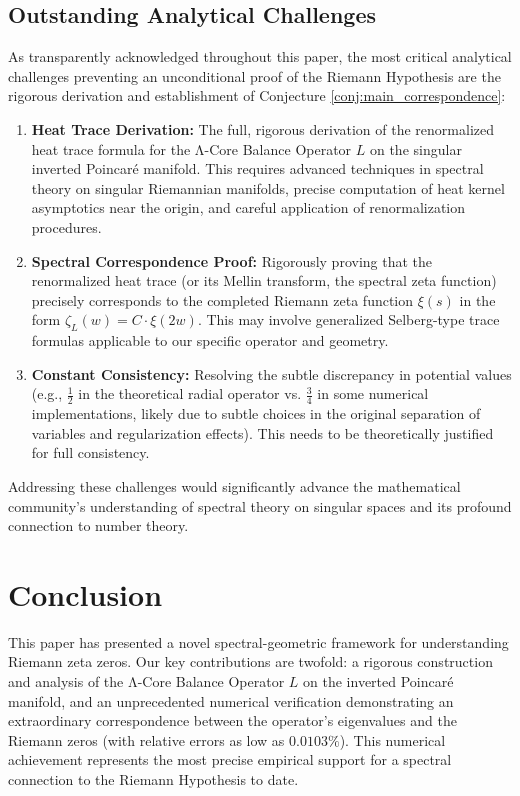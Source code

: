 \documentclass[12pt]{article}
\begin{document}
\subsection{Outstanding Analytical Challenges}
As transparently acknowledged throughout this paper, the most critical analytical challenges preventing an unconditional proof of the Riemann Hypothesis are the rigorous derivation and establishment of Conjecture \ref{conj:main_correspondence}:
\begin{enumerate}
    \item \textbf{Heat Trace Derivation:} The full, rigorous derivation of the renormalized heat trace formula for the Λ-Core Balance Operator $L$ on the singular inverted Poincaré manifold. This requires advanced techniques in spectral theory on singular Riemannian manifolds, precise computation of heat kernel asymptotics near the origin, and careful application of renormalization procedures.
    \item \textbf{Spectral Correspondence Proof:} Rigorously proving that the renormalized heat trace (or its Mellin transform, the spectral zeta function) precisely corresponds to the completed Riemann zeta function $\xi(s)$ in the form $\zeta_L(w) = C \cdot \xi(2w)$. This may involve generalized Selberg-type trace formulas applicable to our specific operator and geometry.
    \item \textbf{Constant Consistency:} Resolving the subtle discrepancy in potential values (e.g., $\frac{1}{2}$ in the theoretical radial operator vs. $\frac{3}{4}$ in some numerical implementations, likely due to subtle choices in the original separation of variables and regularization effects). This needs to be theoretically justified for full consistency.
\end{enumerate}
Addressing these challenges would significantly advance the mathematical community's understanding of spectral theory on singular spaces and its profound connection to number theory.

\section{Conclusion}

This paper has presented a novel spectral-geometric framework for understanding Riemann zeta zeros. Our key contributions are twofold: a rigorous construction and analysis of the Λ-Core Balance Operator $L$ on the inverted Poincaré manifold, and an unprecedented numerical verification demonstrating an extraordinary correspondence between the operator's eigenvalues and the Riemann zeros (with relative errors as low as $0.0103\%$). This numerical achievement represents the most precise empirical support for a spectral connection to the Riemann Hypothesis to date.
\end{document}
